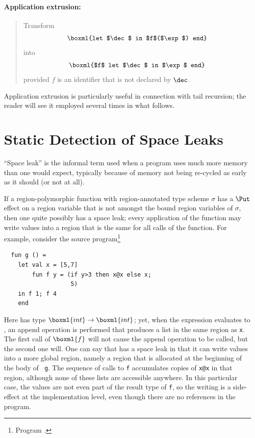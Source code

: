 \documentclass[12pt]{book}
\begin{document}
\subsubsection*{Application extrusion:}
\begin{quote}
%
Transform
$$\boxml{let $\dec$ in $f$($\exp$) end}$$
into
$$\boxml{$f$ let $\dec$ in $\exp$ end}$$
provided $f$ is an identifier that is not declared by $\dec$.
\end{quote}

Application extrusion is particularly useful
in connection with
%
tail recursion; the reader will see it employed several times in what
follows.
%

\chapter{Static Detection of Space Leaks}
\label{spaceleak.sec}

``Space leak'' is the informal term used when a program uses much more
memory than one would expect, typically because of memory not being
re-cycled as early as it should (or not at all).

If a region-polymorphic function with region-annotated type scheme
$\sigma$ has a $\Put$ effect on a region variable that is not amongst the
bound region variables of $\sigma$, then one quite possibly has a
space leak; every application of the function may write values into a
region that is the same for all calls of the function. For example,
consider the source program\footnote{Program
  .}
\begin{verbatim}
  fun g () =
    let val x = [5,7]
        fun f y = (if y>3 then x@x else x;
                   5)
    in f 1; f 4
    end
\end{verbatim} 
Here  has type $\boxml{int}\to\boxml{int}$; yet, when the
expression  evaluates to , an append operation
is performed that produces a list in the same region as {\tt x}. The
first call of $\boxml{f}$ will not cause the append operation to be
called, but the second one will. One can say that  has a
space leak in that it can write values into a more global region,
namely a region that is allocated at the beginning of the body of {\tt
  g}. The sequence of calls to {\tt f} accumulates copies of {\tt x@x}
in that region, although none of these lists are accessible anywhere.
In this particular case, the values are not even part of the result
type of {\tt f}, so the writing is a side-effect at the implementation
level, even though there are no references in the program.
\end{document}
